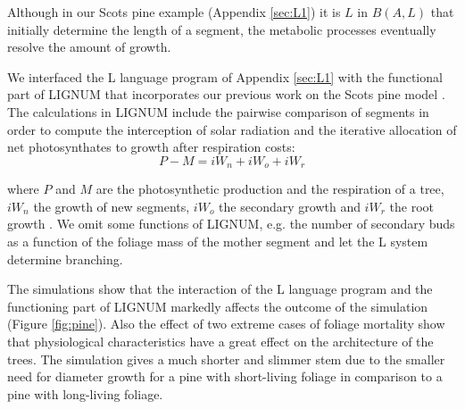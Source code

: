 Although in our  Scots pine example (Appendix \ref{sec:L1})  it is $L$
in  $B(A,L)$ that  initially determine  the length  of a  segment, the
metabolic processes eventually resolve the amount of growth.
  
We interfaced the L language program of Appendix \ref{sec:L1} with the
functional part of  LIGNUM that incorporates our previous  work on the
Scots pine model \citep{perttunen:96, perttunen:98}.  The calculations
in  LIGNUM include  the pairwise  comparison of  segments in  order to
compute  the  interception  of   solar  radiation  and  the  iterative
allocation of  net photosynthates  to growth after  respiration costs:
\begin{equation} P - M = iW_n + iW_o + iW_r \end{equation}

where  $P$   and  $M$  are  the  photosynthetic   production  and  the
respiration of a  tree, $iW_n$ the growth of  new segments, $iW_o$ the
secondary      growth     and      $iW_r$     the      root     growth
\citep[c.f.][]{perttunen:96,perttunen:98, perttunen:01}.  We omit some
functions of LIGNUM,  e.g. the number of secondary  buds as a function
of  the foliage  mass  of the  mother  segment and  let  the L  system
determine branching.

The simulations  show that the  interaction of the L  language program
and the functioning part of LIGNUM markedly affects the outcome of the
simulation (Figure  \ref{fig:pine}).  Also  the effect of  two extreme
cases  of foliage  mortality show  that  physiological characteristics
have a great effect on  the architecture of the trees.  The simulation
gives a  much shorter  and slimmer  stem due to  the smaller  need for
diameter growth for a pine  with short-living foliage in comparison to
a pine with long-living foliage.

